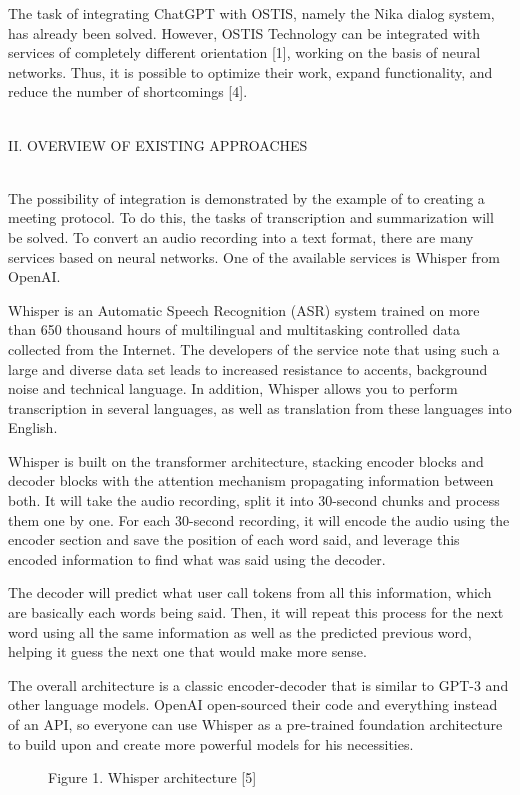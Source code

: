 \documentclass [a4paper, 10pt, twocolumn] {article}
\begin{document}
The task of integrating ChatGPT with OSTIS, namely
the Nika dialog system, has already been solved. However,
OSTIS Technology can be integrated with services of
completely different orientation [1], working on the basis
of neural networks. Thus, it is possible to optimize their
work, expand functionality, and reduce the number of
shortcomings [4].
\\\\
\centerline{\large{II. O\small{VERVIEW OF EXISTING APPROACHES}}}
\\

The possibility of integration is demonstrated by the
example of to creating a meeting protocol. To do this, the
tasks of transcription and summarization will be solved.
To convert an audio recording into a text format, there
are many services based on neural networks. One of the
available services is Whisper from OpenAI.

Whisper is an Automatic Speech Recognition (ASR)
system trained on more than 650 thousand hours of
multilingual and multitasking controlled data collected
from the Internet. The developers of the service note that
using such a large and diverse data set leads to increased
resistance to accents, background noise and technical
language. In addition, Whisper allows you to perform
transcription in several languages, as well as translation
from these languages into English.

Whisper is built on the transformer architecture, stacking encoder blocks and decoder blocks with the attention
mechanism propagating information between both. It
will take the audio recording, split it into 30-second
chunks and process them one by one. For each 30-second
recording, it will encode the audio using the encoder
section and save the position of each word said, and
leverage this encoded information to find what was said
using the decoder.

The decoder will predict what user call tokens from all
this information, which are basically each words being
said. Then, it will repeat this process for the next word
using all the same information as well as the predicted
previous word, helping it guess the next one that would
make more sense.

The overall architecture is a classic encoder-decoder
that is similar to GPT-3 and other language models.
OpenAI open-sourced their code and everything instead
of an API, so everyone can use Whisper as a pre-trained
foundation architecture to build upon and create more
powerful models for his necessities.
\begin{figure}[H]
	\caption*{Figure 1. Whisper architecture [5]}
\end{figure}
\end{document}
